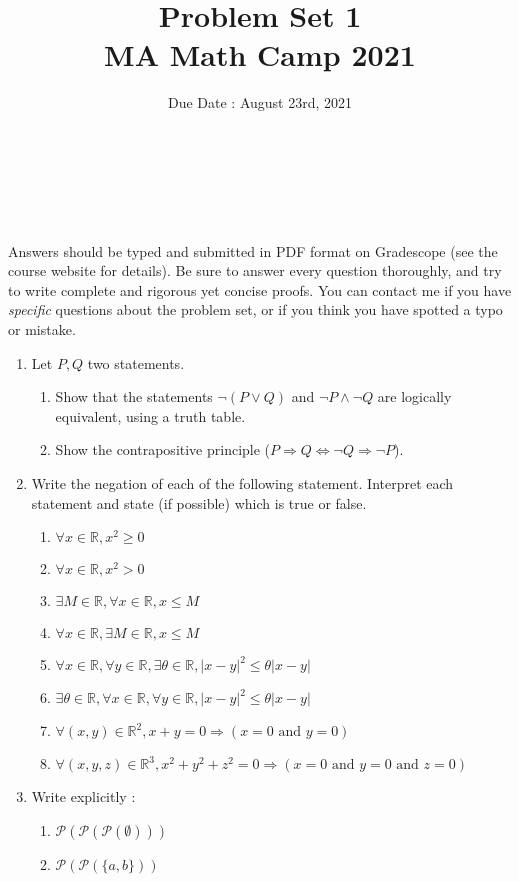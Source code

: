 \documentclass[11pt,letterpaper]{scrartcl}
\title{Problem Set 1 \\ MA Math Camp 2021 }
\author{ Due Date : August 23rd, 2021 }
\date{  }
\makeatletter
\newcommand{\reals}{\mathbb{R}}
\newcommand{\Pcal}{\mathcal{P}}
\let\thetitle\@title
\let\theauthor\@author
\let\thedate\@date
\newcommand\makesimpletitle{%
\noindent 
\textbf{\large \thetitle} \\
\-\ \hspace{.2cm} { \large \theauthor } \\ 
\-\ \hspace{.2cm} { \normalsize \thedate }
}
\makeatother
\begin{document}


\makesimpletitle

Answers should be typed and submitted in PDF format on Gradescope (see the course website for details). Be sure to answer every question thoroughly, and try to write complete and rigorous yet concise proofs. You can contact me if you have \emph{specific} questions about the problem set, or if you think you have spotted a typo or mistake.

\vspace{.5cm}

\begin{enumerate}
	
	\item Let $P,Q$ two statements.
	\begin{enumerate}[label=\alph*.]
		\item Show that the statements $\neg (P \vee Q)$ and $\neg P \wedge \neg Q$ are logically equivalent, using a truth table.
		\item Show the contrapositive principle ($P \Rightarrow Q \Leftrightarrow \neg Q \Rightarrow \neg P$).
	\end{enumerate}


	\item 
	Write the negation of each of the following statement. Interpret each statement and state (if possible) which is true or false.
		\begin{enumerate}[label=\alph*.]
			\item $\forall x \in \reals, x^2 \geq 0$
			\item $\forall x \in \reals, x^2 > 0$
			\item $\exists M \in \reals, \forall x \in \reals, x \leq M$
			\item $\forall x \in \reals, \exists M \in \reals, x \leq M$
			\item $\forall x \in \reals, \forall y \in \reals, \exists \theta \in \reals, |x-y|^2 \leq \theta|x-y|$
			\item $\exists \theta \in \reals, \forall x \in \reals, \forall y \in \reals, |x-y|^2 \leq \theta|x-y|$
			\item $\forall (x,y) \in \reals^2, x+y=0 \Rightarrow (x=0 \text{ and } y=0)$
			\item $\forall (x,y,z) \in \reals^3, x^2+y^2+z^2=0 \Rightarrow (x=0 \text{ and } y=0 \text{ and } z=0)$
		\end{enumerate}


	\item Write explicitly :
	\begin{enumerate}[label=\alph*.]
		\item $\Pcal(\Pcal(\Pcal(\emptyset)))$
		\item $\Pcal(\Pcal(\{a,b\}))$
	\end{enumerate}


\end{enumerate}
\end{document}
